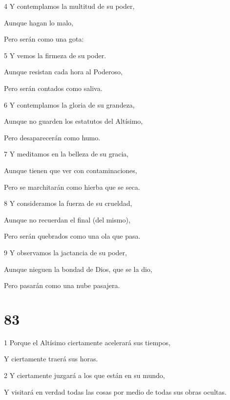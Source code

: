 \par 4 Y contemplamos la multitud de su poder,

\par Aunque hagan lo malo,

Pero serán como una gota:

\par 5 Y vemos la firmeza de su poder.

\par Aunque resistan cada hora al Poderoso,

Pero serán contados como saliva.

\par 6 Y contemplamos la gloria de su grandeza,

\par Aunque no guarden los estatutos del Altísimo,

Pero desaparecerán como humo.

\par 7 Y meditamos en la belleza de su gracia,

\par Aunque tienen que ver con contaminaciones,

Pero se marchitarán como hierba que se seca.

\par 8 Y consideramos la fuerza de su crueldad,

\par Aunque no recuerdan el final (del mismo),

Pero serán quebrados como una ola que pasa.

\par 9 Y observamos la jactancia de su poder,

\par Aunque nieguen la bondad de Dios, que se la dio,

Pero pasarán como una nube pasajera.

\chapter{83}

\par 1 Porque el Altísimo ciertamente acelerará sus tiempos,

\par Y ciertamente traerá sus horas.

\par 2 Y ciertamente juzgará a los que están en su mundo,

\par Y visitará en verdad todas las cosas por medio de todas sus obras ocultas.

